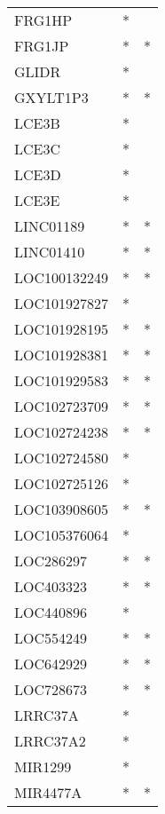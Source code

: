 \begin{tabular}{lcc}
FRG1HP             &         * &         \\
FRG1JP             &         * &       * \\
GLIDR              &         * &         \\
GXYLT1P3           &         * &       * \\
LCE3B              &         * &         \\
LCE3C              &         * &         \\
LCE3D              &         * &         \\
LCE3E              &         * &         \\
LINC01189          &         * &       * \\
LINC01410          &         * &       * \\
LOC100132249       &         * &       * \\
LOC101927827       &         * &         \\
LOC101928195       &         * &       * \\
LOC101928381       &         * &       * \\
LOC101929583       &         * &       * \\
LOC102723709       &         * &       * \\
LOC102724238       &         * &       * \\
LOC102724580       &         * &         \\
LOC102725126       &         * &         \\
LOC103908605       &         * &       * \\
LOC105376064       &         * &         \\
LOC286297          &         * &       * \\
LOC403323          &         * &       * \\
LOC440896          &         * &         \\
LOC554249          &         * &       * \\
LOC642929          &         * &       * \\
LOC728673          &         * &       * \\
LRRC37A            &         * &         \\
LRRC37A2           &         * &         \\
MIR1299            &         * &         \\
MIR4477A           &         * &       * \\

\end{tabular}
